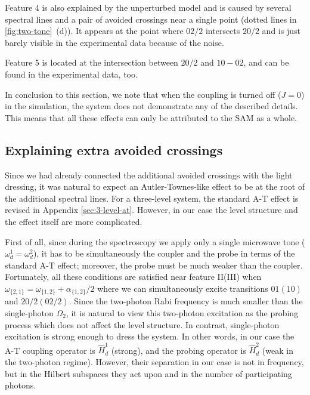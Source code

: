 \documentclass[%
 pra,
 amsmath,amssymb,
 reprint,%
]{revtex4-1}
\begin{document}
Feature 4 is also explained by the unperturbed 
model and is caused by several spectral lines and 
a pair of avoided crossings near a single point 
(dotted lines in \autoref{fig:two-tone}~(d)). It 
appears at the point where ${02/2}$ intersects 
${20/2}$ and is just barely visible in the 
experimental data because of the noise. 

Feature 5 is located at the intersection between ${20/2}$ 
and ${10} - {02}$, and can be 
found in the experimental data, too. 

In conclusion to this section, we note that when the coupling is turned off ($J=0$) in the simulation, the system does not demonstrate any of the described details. This means that all these effects can only be attributed to the SAM as a whole. 

\subsection{Explaining extra avoided crossings}\label{sec:theory}

Since we had already connected the additional 
avoided crossings with the light dressing, it was 
natural to expect an Autler-Townes-like effect to 
be at the root of the additional spectral lines. 
For a three-level system, the standard A-T effect 
is revised in Appendix \ref{sec:3-level-at}. 
However, in our case the level structure and the 
effect itself are more complicated. 

First of all, since during the spectroscopy we 
apply only a single microwave tone ($\omega_d^1 = 
\omega_d^2$), it has to be 
simultaneously the coupler and the probe
in terms of the standard A-T effect; moreover, the 
probe must be much weaker than the coupler. 
Fortunately, all these conditions are satisfied near feature II(III) when 
$\omega_{\{2,1\}} = 
\omega_{\{1,2\}}+\alpha_{\{1,2\}}/2$  where we 
can simultaneously excite transitions $01 (10)$ 
and $20/2 (02/2)$. Since the two-photon Rabi 
frequency is much smaller than the single-photon 
$\Omega_2$, it is natural to view this two-photon 
excitation as the probing process which does not 
affect the level structure. In contrast, 
single-photon excitation is strong enough to 
dress the system. In other words, in our case the 
A-T coupling operator is $\hat H_{d}^1$ (strong), 
and the probing operator is $\hat H_{d}^2$ (weak 
in the two-photon regime). However, their 
separation in our case is not in frequency, but 
in the Hilbert subspaces they act upon and in the number of participating photons.
\end{document}
